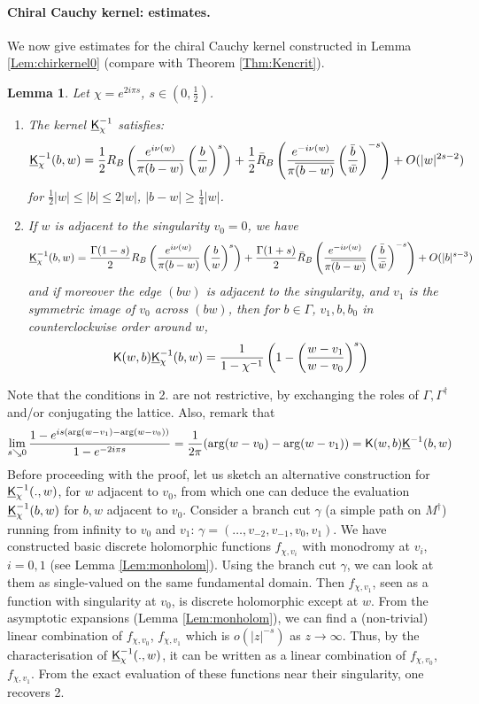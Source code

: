 \documentclass[10pt]{article}
\newcommand{\rK}{{\sf K}}
\newcommand{\uK}{{\underline {\sf K}}}
\newcommand{\dg}{\dagger}
\newtheorem{Lem}[thm]{Lemma}
\begin{document}
\paragraph{Chiral Cauchy kernel: estimates.\\}

We now give estimates for the chiral Cauchy kernel constructed in Lemma \ref{Lem:chirkernel0} (compare with Theorem \ref{Thm:Kencrit}).

\begin{Lem}\label{Lem:monCauchy}
Let $\chi=e^{2i\pi s}$, $s\in(0,\frac 12)$. 
%
\begin{enumerate}
\item The kernel $\uK_\chi^{-1}$ satisfies:
$$\uK^{-1}_\chi(b,w)=\frac 12R_B\left(\frac{e^{i\nu(w)}}{\pi(b-w)}\left(\frac bw\right)^s\right)+\frac 12\bar R_B\left(\frac{e^{-i\nu(w)}}{\pi\overline{(b-w)}}\left(\frac {\bar b}{\bar w}\right)^{-s}\right)+O(|w|^{2s-2})$$
for $\frac 12|w|\leq|b|\leq 2|w|$, $|b-w|\geq\frac 14|w|$.
\item 
If $w$ is adjacent to the singularity $v_0=0$, we have
$$\uK^{-1}_\chi(b,w)=\frac {\Gamma(1-s)}2R_B\left(\frac{e^{i\nu(w)}}{\pi(b-w)}\left(\frac bw\right)^s\right)+\frac {\Gamma(1+s)}2\bar R_B\left(\frac{e^{-i\nu(w)}}{\pi\overline{(b-w)}}\left(\frac {\bar b}{\bar w}\right)^{-s}\right)+O(|b|^{s-3})$$
and if moreover the edge $(bw)$ is adjacent to the singularity, and $v_1$ is the symmetric image of $v_0$ across $(bw)$, then for $b\in\Gamma$, $v_1,b,b_0$ in counterclockwise order around $w$, 
$$\rK(w,b)\uK^{-1}_\chi(b,w)=\frac{1}{1-\chi^{-1}}\left(1-\left(\frac{w-v_1}{w-v_0}\right)^s\right)$$
\end{enumerate}
\end{Lem}
Note that the conditions in 2. are not restrictive, by exchanging the roles of $\Gamma,\Gamma^\dg$ and/or conjugating the lattice. Also, remark that
$$\lim_{s\searrow 0}\frac{1-e^{is(\arg(w-v_1)-\arg(w-v_0))}}{1-e^{-2i\pi s}}=\frac{1}{2\pi}(\arg(w-v_0)-\arg(w-v_1))=\rK(w,b)\uK^{-1}(b,w)$$
Before proceeding with the proof, let us sketch an alternative construction for $\uK_\chi^{-1}(.,w)$, for $w$ adjacent to $v_0$, from which one can deduce the evaluation $\uK_\chi^{-1}(b,w)$ for $b,w$ adjacent to $v_0$. Consider a branch cut $\gamma$ (a simple path on $M^\dg$) running from infinity to $v_0$ and $v_1$: $\gamma=(\dots,v_{-2},v_{-1},v_0,v_1)$. We have constructed basic discrete holomorphic functions $f_{\chi,v_i}$ with monodromy at $v_i$, $i=0,1$ (see Lemma \ref{Lem:monholom}). Using the branch cut $\gamma$, we can look at them as single-valued on the same fundamental domain. Then $f_{\chi,v_1}$, seen as a function with singularity at $v_0$, is discrete holomorphic except at $w$. From the asymptotic expansions (Lemma \ref{Lem:monholom}), we can find a (non-trivial) linear combination of $f_{\chi,v_0}$, $f_{\chi,v_1}$ which is $o(|z|^{-s})$ as $z\rightarrow\infty$. Thus, by the characterisation of $\uK_{\chi}^{-1}(.,w)$, it can be written as a linear combination of $f_{\chi,v_0}$, $f_{\chi,v_1}$. From the exact evaluation of these functions near their singularity, one recovers 2.
\end{document}
